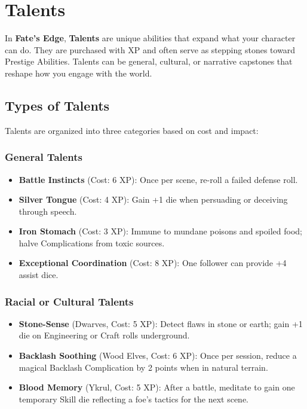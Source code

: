 
\chapter{Talents}

In \textbf{Fate's Edge}, \textbf{Talents} are unique abilities that expand what your character can do. They are purchased with XP and often serve as stepping stones toward Prestige Abilities. Talents can be general, cultural, or narrative capstones that reshape how you engage with the world.

\section{Types of Talents}

Talents are organized into three categories based on cost and impact:

\subsection*{General Talents}

\begin{itemize}
    \item \textbf{Battle Instincts} (Cost: 6 XP): Once per scene, re-roll a failed defense roll.
    \item \textbf{Silver Tongue} (Cost: 4 XP): Gain +1 die when persuading or deceiving through speech.
    \item \textbf{Iron Stomach} (Cost: 3 XP): Immune to mundane poisons and spoiled food; halve Complications from toxic sources.
    \item \textbf{Exceptional Coordination} (Cost: 8 XP): One follower can provide +4 assist dice.
\end{itemize}

\subsection*{Racial or Cultural Talents}

\begin{itemize}
    \item \textbf{Stone-Sense} (Dwarves, Cost: 5 XP): Detect flaws in stone or earth; gain +1 die on Engineering or Craft rolls underground.
    \item \textbf{Backlash Soothing} (Wood Elves, Cost: 6 XP): Once per session, reduce a magical Backlash Complication by 2 points when in natural terrain.
    \item \textbf{Blood Memory} (Ykrul, Cost: 5 XP): After a battle, meditate to gain one temporary Skill die reflecting a foe's tactics for the next scene.
\end{itemize}

